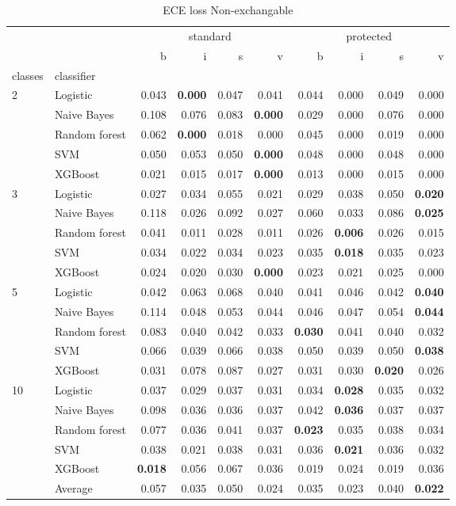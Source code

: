 \begin{table}
\caption{ECE loss Non-exchangable}
\begin{tabular}{l|l|rrrr|rrrr}
\toprule
 &  & \multicolumn{4}{c}{standard} & \multicolumn{4}{c}{protected} \\
 &  & b & i & s & v & b & i & s & v \\
classes & classifier &  &  &  &  &  &  &  &  \\
\midrule
\midrule
\multirow[c]{5}{*}{2} & Logistic & 0.043 & \textbf{0.000} & 0.047 & 0.041 & 0.044 & 0.000 & 0.049 & 0.000 \\
 & Naive Bayes & 0.108 & 0.076 & 0.083 & \textbf{0.000} & 0.029 & 0.000 & 0.076 & 0.000 \\
 & Random forest & 0.062 & \textbf{0.000} & 0.018 & 0.000 & 0.045 & 0.000 & 0.019 & 0.000 \\
 & SVM & 0.050 & 0.053 & 0.050 & \textbf{0.000} & 0.048 & 0.000 & 0.048 & 0.000 \\
 & XGBoost & 0.021 & 0.015 & 0.017 & \textbf{0.000} & 0.013 & 0.000 & 0.015 & 0.000 \\
\midrule
\multirow[c]{5}{*}{3} & Logistic & 0.027 & 0.034 & 0.055 & 0.021 & 0.029 & 0.038 & 0.050 & \textbf{0.020} \\
 & Naive Bayes & 0.118 & 0.026 & 0.092 & 0.027 & 0.060 & 0.033 & 0.086 & \textbf{0.025} \\
 & Random forest & 0.041 & 0.011 & 0.028 & 0.011 & 0.026 & \textbf{0.006} & 0.026 & 0.015 \\
 & SVM & 0.034 & 0.022 & 0.034 & 0.023 & 0.035 & \textbf{0.018} & 0.035 & 0.023 \\
 & XGBoost & 0.024 & 0.020 & 0.030 & \textbf{0.000} & 0.023 & 0.021 & 0.025 & 0.000 \\
\midrule
\multirow[c]{5}{*}{5} & Logistic & 0.042 & 0.063 & 0.068 & 0.040 & 0.041 & 0.046 & 0.042 & \textbf{0.040} \\
 & Naive Bayes & 0.114 & 0.048 & 0.053 & 0.044 & 0.046 & 0.047 & 0.054 & \textbf{0.044} \\
 & Random forest & 0.083 & 0.040 & 0.042 & 0.033 & \textbf{0.030} & 0.041 & 0.040 & 0.032 \\
 & SVM & 0.066 & 0.039 & 0.066 & 0.038 & 0.050 & 0.039 & 0.050 & \textbf{0.038} \\
 & XGBoost & 0.031 & 0.078 & 0.087 & 0.027 & 0.031 & 0.030 & \textbf{0.020} & 0.026 \\
\midrule
\multirow[c]{5}{*}{10} & Logistic & 0.037 & 0.029 & 0.037 & 0.031 & 0.034 & \textbf{0.028} & 0.035 & 0.032 \\
 & Naive Bayes & 0.098 & 0.036 & 0.036 & 0.037 & 0.042 & \textbf{0.036} & 0.037 & 0.037 \\
 & Random forest & 0.077 & 0.036 & 0.041 & 0.037 & \textbf{0.023} & 0.035 & 0.038 & 0.034 \\
 & SVM & 0.038 & 0.021 & 0.038 & 0.031 & 0.036 & \textbf{0.021} & 0.036 & 0.032 \\
 & XGBoost & \textbf{0.018} & 0.056 & 0.067 & 0.036 & 0.019 & 0.024 & 0.019 & 0.036 \\\midrule\ & Average & 0.057 & 0.035 & 0.050 & 0.024 & 0.035 & 0.023 & 0.040 & \textbf{0.022} \\
\bottomrule
\end{tabular}
\end{table}
